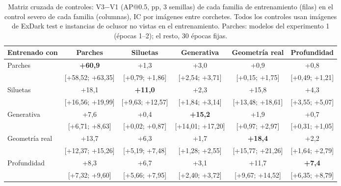 \begin{table}[H]\centering\scriptsize
\caption{Matriz cruzada de controles: V3$-$V1 (AP@0.5, pp, 3 semillas) de cada familia de entrenamiento (filas) en el control severo de cada familia (columnas), IC por imágenes entre corchetes. Todos los controles usan imágenes de ExDark test e instancias de oclusor no vistas en el entrenamiento. Parches: modelos del experimento 1 (épocas 1--2); el resto, 30 épocas fijas.}\label{tab:s-cruzada}
\setlength{\tabcolsep}{2pt}\begin{tabular}{@{}l ccccc@{}}\toprule
Entrenado con & Parches & Siluetas & Generativa & Geometría real & Profundidad \\ \midrule
Parches & \textbf{+60{,}9} & +1{,}3 & +3{,}0 & +0{,}9 & +0{,}8 \\
 & {\tiny [+58{,}52; +63{,}35]} & {\tiny [+0{,}79; +1{,}86]} & {\tiny [+2{,}54; +3{,}71]} & {\tiny [+0{,}15; +1{,}75]} & {\tiny [+0{,}49; +1{,}21]} \\[2pt]
Siluetas & +18{,}1 & \textbf{+11{,}0} & +2{,}3 & +15{,}8 & +4{,}3 \\
 & {\tiny [+16{,}56; +19{,}99]} & {\tiny [+9{,}63; +12{,}57]} & {\tiny [+1{,}84; +3{,}14]} & {\tiny [+13{,}48; +18{,}61]} & {\tiny [+3{,}55; +5{,}07]} \\[2pt]
Generativa & +7{,}6 & +0{,}4 & \textbf{+15{,}2} & +1{,}9 & +0{,}7 \\
 & {\tiny [+6{,}71; +8{,}63]} & {\tiny [+0{,}02; +0{,}87]} & {\tiny [+14{,}01; +17{,}20]} & {\tiny [+0{,}97; +2{,}97]} & {\tiny [+0{,}31; +1{,}05]} \\[2pt]
Geometría real & +13{,}7 & +6{,}3 & +1{,}7 & \textbf{+18{,}4} & +2{,}2 \\
 & {\tiny [+12{,}37; +15{,}26]} & {\tiny [+5{,}19; +7{,}48]} & {\tiny [+1{,}28; +2{,}55]} & {\tiny [+15{,}77; +21{,}26]} & {\tiny [+1{,}64; +2{,}79]} \\[2pt]
Profundidad & +8{,}3 & +6{,}7 & +3{,}1 & +11{,}7 & \textbf{+7{,}4} \\
 & {\tiny [+7{,}32; +9{,}60]} & {\tiny [+5{,}66; +7{,}95]} & {\tiny [+2{,}40; +3{,}72]} & {\tiny [+9{,}67; +14{,}52]} & {\tiny [+6{,}35; +8{,}79]} \\[2pt]
\bottomrule\end{tabular}\end{table}

